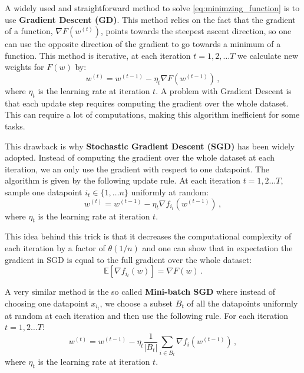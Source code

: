 \documentclass[a4paper,11pt,oneside]{report}
\begin{document}
A widely used and straightforward method to solve \autoref{eq:minimzing_function} is to use \textbf{Gradient Descent (GD)}. This method relies on the fact that the gradient of a function, $\nabla F(w^{(t)})$, points towards the steepest ascent direction, so one can use the opposite direction of the gradient to go towards a minimum of a function. This method is iterative, at each iteration $t=1,2, \dots T$ we calculate new weights for $F(w)$ by:
\begin{equation}\label{eq:GD}
    w^{(t)} = w^{(t-1)} - \eta_t \nabla F(w^{(t-1)}) \,,
\end{equation}
where $\eta_t$ is the learning rate at iteration $t$.
A problem with Gradient Descent is that each update step requires computing the gradient over the whole dataset. This can require a lot of computations, making this algorithm inefficient for some tasks. 

This drawback is why \textbf{Stochastic Gradient Descent (SGD)} has been widely adopted. Instead of computing the gradient over the whole dataset at each iteration, we an only use the gradient with respect to one datapoint. The algorithm is given by the following update rule. At each iteration $t=1,2 \dots T$, sample one datapoint $i_t \in \{1,\dots n\}$ uniformly at random:
\begin{equation}\label{eq:SGD}
    w^{(t)} = w^{(t-1)} -\eta_t \nabla f_{i_t}(w^{(t-1)})\,,
\end{equation}
where $\eta_t$ is the learning rate at iteration $t$.

This idea behind this trick is that it decreases the computational complexity of each iteration by a factor of $\theta(1/n)$ and one can show that in expectation the gradient in SGD is equal to the full gradient over the whole dataset:
\begin{equation}\label{eq:unbaisedSGD}
    \mathbb{E}[\nabla f_{i_t}(w)] = \nabla F(w)\,.
\end{equation}

A very similar method is the so called \textbf{Mini-batch SGD} where instead of choosing one datapoint $x_{i_t}$, we choose a subset $B_t$ of all the datapoints uniformly at random at each iteration and then use the following  rule. For each iteration $t = 1,2 \dots T$:
\begin{equation}\label{eq:minibatchSGD}
    w^{(t)} = w^{(t-1)} -\eta_t \frac{1}{\mathopen|B_t\mathclose|}\sum_{i \in B_t}\nabla f_{i}(w^{(t-1)})\,,
\end{equation}
where $\eta_t$ is the learning rate at iteration $t$.
\end{document}
